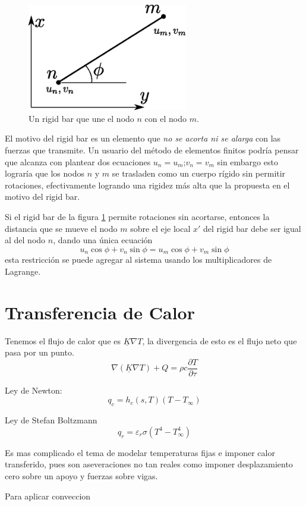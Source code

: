 \documentclass[11pt, a4paper,titlepage]{article}
\begin{document}
\begin{figure}[htb!]
	\centering
	\includegraphics[width=7cm]{fig/rigidbarschematic.eps}
	\caption{Un rigid bar que une el nodo $n$ con el nodo $m$.}
	\label{fig:rigidbarschematic}
\end{figure}

El motivo del rigid bar es un elemento que \textit{no se acorta ni se alarga} con las fuerzas que transmite. Un usuario del método de elementos finitos podría pensar que alcanza con plantear dos ecuaciones $u_n=u_m$;$v_n=v_m$ sin embargo esto lograría que los nodos $n$ y $m$ se trasladen como un cuerpo rígido sin permitir rotaciones, efectivamente logrando una rigidez más alta que la propuesta en el motivo del rigid bar.

Si el rigid bar de la figura \ref{fig:rigidbarschematic} permite rotaciones sin acortarse, entonces la distancia que se mueve el nodo $m$ sobre el eje local $x'$ del rigid bar debe ser igual al del nodo $n$, dando una única ecuación
\[
u_n\cos\phi + v_n \sin\phi = u_m\cos\phi +v_m\sin\phi  
\]
esta restricción se puede agregar al sistema usando los multiplicadores de Lagrange.
\section{Transferencia de Calor}

Tenemos el flujo de calor que es $\underline{K} \nabla T$, la divergencia de esto es el flujo neto que pasa por un punto.
\[
\nabla(\underline{K} \nabla T)+Q=\rho c \frac{\partial T}{\partial \tau}
\] 

Ley de Newton: 
\[
q_{c}=h_{c}(s, T)\left(T-T_{\infty}\right)
\]

Ley de Stefan Boltzmann
\[
q_{r}=\varepsilon_{r} \sigma\left(T^{4}-T_{\infty}^{4}\right)
\]

Es mas complicado el tema de modelar temperaturas fijas e imponer calor transferido, pues son aseveraciones no tan reales como imponer desplazamiento cero sobre un apoyo y  fuerzas sobre vigas.

Para aplicar conveccion 
\end{document}
